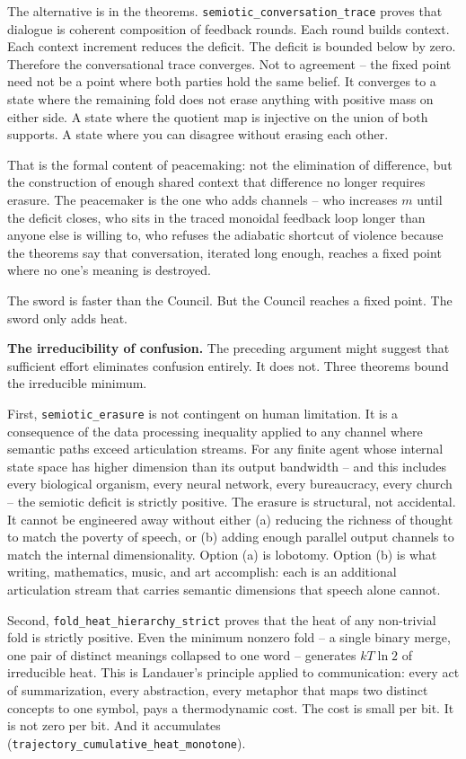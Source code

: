 \documentclass[
  11pt,
]{article}
\begin{document}
The alternative is in the theorems.
\texttt{semiotic\_conversation\_trace} proves that dialogue is coherent
composition of feedback rounds. Each round builds context. Each context
increment reduces the deficit. The deficit is bounded below by zero.
Therefore the conversational trace converges. Not to agreement -- the
fixed point need not be a point where both parties hold the same belief.
It converges to a state where the remaining fold does not erase anything
with positive mass on either side. A state where the quotient map is
injective on the union of both supports. A state where you can disagree
without erasing each other.

That is the formal content of peacemaking: not the elimination of
difference, but the construction of enough shared context that
difference no longer requires erasure. The peacemaker is the one who
adds channels -- who increases \(m\) until the deficit closes, who sits
in the traced monoidal feedback loop longer than anyone else is willing
to, who refuses the adiabatic shortcut of violence because the theorems
say that conversation, iterated long enough, reaches a fixed point where
no one's meaning is destroyed.

The sword is faster than the Council. But the Council reaches a fixed
point. The sword only adds heat.

\textbf{The irreducibility of confusion.} The preceding argument might
suggest that sufficient effort eliminates confusion entirely. It does
not. Three theorems bound the irreducible minimum.

First, \texttt{semiotic\_erasure} is not contingent on human limitation.
It is a consequence of the data processing inequality applied to any
channel where semantic paths exceed articulation streams. For any finite
agent whose internal state space has higher dimension than its output
bandwidth -- and this includes every biological organism, every neural
network, every bureaucracy, every church -- the semiotic deficit is
strictly positive. The erasure is structural, not accidental. It cannot
be engineered away without either (a) reducing the richness of thought
to match the poverty of speech, or (b) adding enough parallel output
channels to match the internal dimensionality. Option (a) is lobotomy.
Option (b) is what writing, mathematics, music, and art accomplish: each
is an additional articulation stream that carries semantic dimensions
that speech alone cannot.

Second, \texttt{fold\_heat\_hierarchy\_strict} proves that the heat of
any non-trivial fold is strictly positive. Even the minimum nonzero fold
-- a single binary merge, one pair of distinct meanings collapsed to one
word -- generates \(kT \ln 2\) of irreducible heat. This is Landauer's
principle applied to communication: every act of summarization, every
abstraction, every metaphor that maps two distinct concepts to one
symbol, pays a thermodynamic cost. The cost is small per bit. It is not
zero per bit. And it accumulates
(\texttt{trajectory\_cumulative\_heat\_monotone}).
\end{document}
